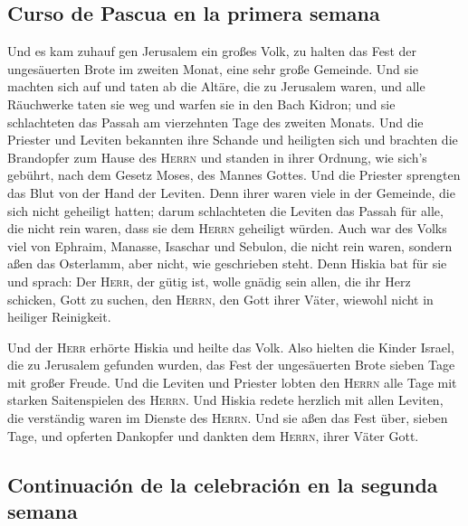 \hypertarget{curso-de-pascua-en-la-primera-semana}{%
\subsection{Curso de Pascua en la primera
semana}\label{curso-de-pascua-en-la-primera-semana}}

 Und es kam zuhauf gen Jerusalem ein großes Volk, zu
halten das Fest der ungesäuerten Brote im zweiten Monat, eine sehr große
Gemeinde.  Und sie machten sich auf und taten ab die
Altäre, die zu Jerusalem waren, und alle Räuchwerke taten sie weg und
warfen sie in den Bach Kidron;  und sie schlachteten das
Passah am vierzehnten Tage des zweiten Monats. Und die Priester und
Leviten bekannten ihre Schande und heiligten sich und brachten die
Brandopfer zum Hause des \textsc{Herrn}  und standen in
ihrer Ordnung, wie sich's gebührt, nach dem Gesetz Moses, des Mannes
Gottes. Und die Priester sprengten das Blut von der Hand der Leviten.
 Denn ihrer waren viele in der Gemeinde, die sich nicht
geheiligt hatten; darum schlachteten die Leviten das Passah für alle,
die nicht rein waren, dass sie dem \textsc{Herrn} geheiligt würden.
 Auch war des Volks viel von Ephraim, Manasse, Isaschar
und Sebulon, die nicht rein waren, sondern aßen das Osterlamm, aber
nicht, wie geschrieben steht. Denn Hiskia bat für sie und sprach: Der
\textsc{Herr}, der gütig ist, wolle gnädig sein  allen,
die ihr Herz schicken, Gott zu suchen, den \textsc{Herrn}, den Gott
ihrer Väter, wiewohl nicht in heiliger Reinigkeit.

 Und der \textsc{Herr} erhörte Hiskia und heilte das
Volk.  Also hielten die Kinder Israel, die zu Jerusalem
gefunden wurden, das Fest der ungesäuerten Brote sieben Tage mit großer
Freude. Und die Leviten und Priester lobten den \textsc{Herrn} alle Tage
mit starken Saitenspielen des \textsc{Herrn}.  Und Hiskia
redete herzlich mit allen Leviten, die verständig waren im Dienste des
\textsc{Herrn}. Und sie aßen das Fest über, sieben Tage, und opferten
Dankopfer und dankten dem \textsc{Herrn}, ihrer Väter Gott.

\hypertarget{continuaciuxf3n-de-la-celebraciuxf3n-en-la-segunda-semana}{%
\subsection{Continuación de la celebración en la segunda
semana}\label{continuaciuxf3n-de-la-celebraciuxf3n-en-la-segunda-semana}}

